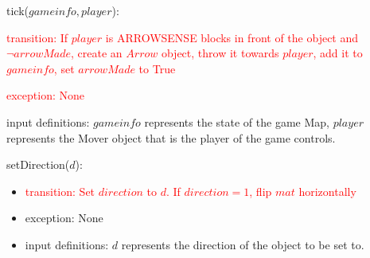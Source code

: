 \documentclass[12pt]{article}
\newcommand{\Implies}{\Rightarrow}
\newcommand{\m}[1]{\mbox{#1}}
\begin{document}
\noindent tick($gameinfo, player$):
\begin{itemize}
    \item \textcolor{red}{transition: If $player$ is ARROWSENSE blocks in front of the object and $\lnot arrowMade$, create an $Arrow$ object, throw it towards $player$, add it to $gameinfo$, set $arrowMade$ to True
    \item exception: None}
    \item input definitions: $gameinfo$ represents the state of the game Map, $player$ represents the Mover object that is the player of the game controls.
\end{itemize}

\noindent setDirection($d$):
\begin{itemize}
    \item \textcolor{red}{transition: Set $direction$ to $d$. If $direction = 1$, flip $mat$ horizontally}
    \item exception: None
    \item input definitions: $d$ represents the direction of the object to be set to. 
\end{itemize}



\end{document}
